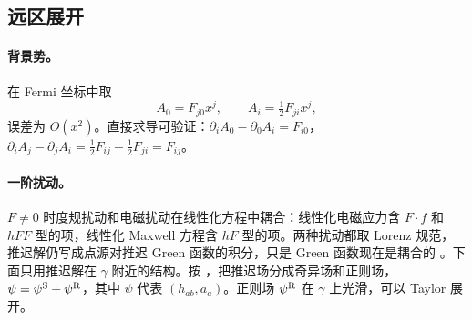 \documentclass[11pt,a4paper]{ctexart}
\numberwithin{equation}{section}
\begin{document}
\subsection{远区展开}
\label{sec:L3far}

\paragraph{背景势。}在 Fermi 坐标中取
\begin{equation}
A_0=F_{j0}x^j,\qquad A_i=\tfrac12F_{ji}x^j,
\label{eq:Abg}
\end{equation}
误差为 $O(x^2)$。直接求导可验证：$\partial_iA_0-\partial_0A_i=F_{i0}$，$\partial_iA_j-\partial_jA_i=\tfrac12F_{ij}-\tfrac12F_{ji}=F_{ij}$。

\paragraph{一阶扰动。}$F\neq0$ 时度规扰动和电磁扰动在线性化方程中耦合：线性化电磁应力含 $F\cdot f$ 和 $hFF$ 型的项，线性化 Maxwell 方程含 $hF$ 型的项。两种扰动都取 Lorenz 规范，推迟解仍写成点源对推迟 Green 函数的积分，只是 Green 函数现在是耦合的 \citep{ZimmermanPoisson2014}。下面只用推迟解在 $\gamma$ 附近的结构。按 \citet{DetweilerWhiting2003}，把推迟场分成奇异场和正则场，$\psi=\psi^{\rm S}+\psi^{\rm R}$，其中 $\psi$ 代表 $(h_{ab},a_a)$。正则场 $\psi^{\rm R}$ 在 $\gamma$ 上光滑，可以 Taylor 展开。
\end{document}
